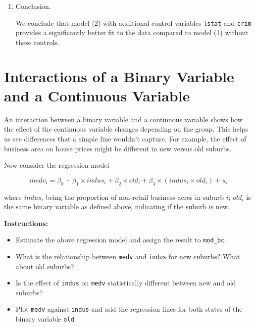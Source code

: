\documentclass[
  12pt,
  a4paper,
]{scrbook}
\providecommand{\tightlist}{%
  \setlength{\itemsep}{0pt}\setlength{\parskip}{0pt}}
\renewcommand{\tightlist}{\setlength{\itemsep}{0.5\baselineskip}\setlength{\parskip}{0.2\baselineskip}}
\theoremstyle{plain}
\theoremstyle{definition}
\theoremstyle{remark}
\begin{document}
\begin{enumerate}
  Since the calculated F-statistic (\(260.56\)) is much larger than the
  critical value (\(3.00\)), we reject the null hypothesis.

  This suggests that at least one of \texttt{lstat} and \texttt{crim}
  significantly improves the model fit.
\item
  Conclusion.

  We conclude that model (2) with additional control variables
  \texttt{lstat} and \texttt{crim} provides a significantly better fit
  to the data compared to model (1) without these controls.
\end{enumerate}

\section{Interactions of a Binary Variable and a Continuous
Variable}\label{interactions-of-a-binary-variable-and-a-continuous-variable}

An interaction between a binary variable and a continuous variable shows
how the effect of the continuous variable changes depending on the
group. This helps us see differences that a simple line wouldn't
capture. For example, the effect of business area on house prices might
be different in new versus old suburbs.

Now consider the regression model

\[
medv_i = \beta_0 + \beta_1 \times indus_i + \beta_2 \times old_i + \beta_3 \times (indus_i\times old_i) + u_i
\]

where \(indus_i\) being the proportion of non-retail business acres in
suburb \(i\); \(old_i\) is the same binary variable as defined above,
indicating if the suburb is new.

\textbf{Instructions:}

\begin{itemize}
\tightlist
\item
  Estimate the above regression model and assign the result to
  \texttt{mod\_bc}.
\item
  What is the relationship between \texttt{medv} and \texttt{indus} for
  new suburbs? What about old suburbs?
\item
  Is the effect of \texttt{indus} on \texttt{medv} statistically
  different between new and old suburbs?
\item
  Plot \texttt{medv} against \texttt{indus} and add the regression lines
  for both states of the binary variable \texttt{old}.
\end{itemize}
\end{document}

